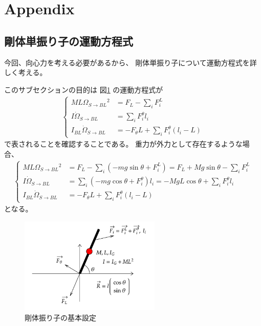 \documentclass[a4paper,11pt]{jsarticle}
\begin{document}
\clearpage
\section{Appendix}
\label{sec:appendix}
\subsection{剛体単振り子の運動方程式}
今回、向心力を考える必要があるから、
剛体単振り子について運動方程式を詳しく考える。

このサブセクションの目的は
図\ref*{Appendix_base_config.png}
の運動方程式が
\begin{align*}
  \begin{cases}
    ML\Omega_{S\rightarrow BL}{}^2  &= F_L - \sum_i F_i^L
    \\
    I\dot\Omega_{S\rightarrow BL}{} &= \sum_i F_i^\theta l_i
    \\
    I_{BL}\dot\Omega_{S\rightarrow BL}{} &= -F_\theta L + \sum_i F_i^\theta ( l_i - L )
  \end{cases}
\end{align*}
で表されることを確認することである。
重力が外力として存在するような場合、
\begin{align*}
  \begin{cases}
    ML\Omega_{S\rightarrow BL}{}^2  &= F_L - \sum_i ( -mg\sin\theta + F_i^L ) = F_L + Mg\sin\theta - \sum_i F_i^L
    \\
    I\dot\Omega_{S\rightarrow BL}{} &= \sum_i ( -mg\cos\theta + F_i^\theta ) l_i = -MgL\cos\theta + \sum_i F_i^\theta l_i
    \\
    I_{BL}\dot\Omega_{S\rightarrow BL}{} &= -F_\theta L + \sum_i F_i^\theta ( l_i - L )
  \end{cases}
\end{align*}
となる。


\begin{figure}[h]
  \centering
  \includegraphics[width = 0.6\textwidth]{Appendix_base_config.png}
  \caption{剛体振り子の基本設定}
  \label{Appendix_base_config.png}
\end{figure}
\end{document}
